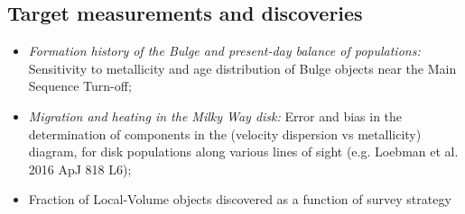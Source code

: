 \subsection{Target measurements and discoveries}
\label{sec:\secname:MW_Future_targets}


\begin{itemize}
  \item {\it Formation history of the Bulge and present-day balance of populations:} Sensitivity to metallicity and age distribution of Bulge objects near the Main Sequence Turn-off;
    \item {\it Migration and heating in the Milky Way disk:} Error and bias in the determination of components in the (velocity dispersion vs metallicity) diagram, for disk populations along various lines of sight (e.g. Loebman et al. 2016 ApJ 818 L6);
    \item Fraction of Local-Volume objects discovered as a function of survey strategy
\end{itemize}
















\navigationbar
